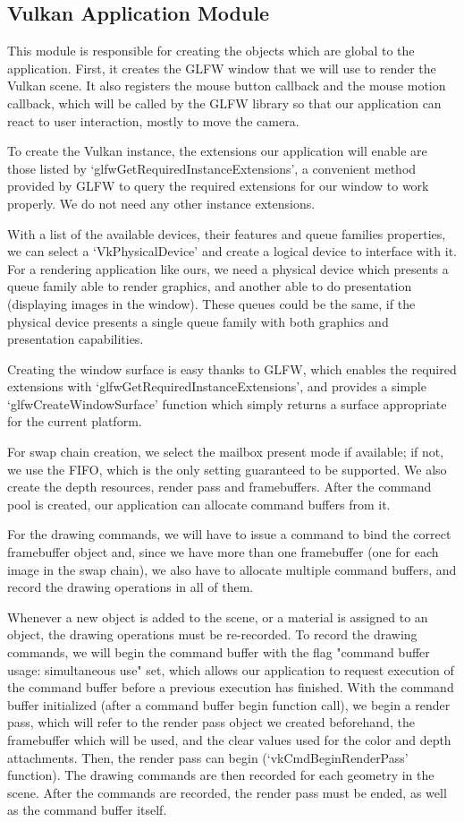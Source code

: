 \subsection{Vulkan Application Module}
This module is responsible for creating the objects which are global to the application. First, it creates the GLFW window that we will use to render the Vulkan scene. It also registers the mouse button callback and the mouse motion callback, which will be called by the GLFW library so that our application can react to user interaction, mostly to move the camera.

To create the Vulkan instance, the extensions our application will enable are those listed by `glfwGetRequiredInstanceExtensions', a convenient method provided by GLFW to query the required extensions for our window to work properly. We do not need any other instance extensions.

With a list of the available devices, their features and queue families properties, we can select a `VkPhysicalDevice' and create a logical device to interface with it. For a rendering application like ours, we need a physical device which presents a queue family able to render graphics, and another able to do presentation (displaying images in the window). These queues could be the same, if the physical device presents a single queue family with both graphics and presentation capabilities.

Creating the window surface is easy thanks to GLFW, which enables the required extensions with `glfwGetRequiredInstanceExtensions', and provides a simple `glfwCreateWindowSurface' function which simply returns a surface appropriate for the current platform.

For swap chain creation, we select the mailbox present mode if available; if not, we use the FIFO, which is the only setting guaranteed to be supported. We also create the depth resources, render pass and framebuffers. After the command pool is created, our application can allocate command buffers from it.

For the drawing commands, we will have to issue a command to bind the correct framebuffer object and, since we have more than one framebuffer (one for each image in the swap chain), we also have to allocate multiple command buffers, and record the drawing operations in all of them.

Whenever a new object is added to the scene, or a material is assigned to an object, the drawing operations must be re-recorded. To record the drawing commands, we will begin the command buffer with the flag "command buffer usage: simultaneous use" set, which allows our application to request execution of the command buffer before a previous execution has finished. With the command buffer initialized (after a command buffer begin function call), we begin a render pass, which will refer to the render pass object we created beforehand, the framebuffer which will be used, and the clear values used for the color and depth attachments. Then, the render pass can begin (`vkCmdBeginRenderPass' function). The drawing commands are then recorded for each geometry in the scene. After the commands are recorded, the render pass must be ended, as well as the command buffer itself.

